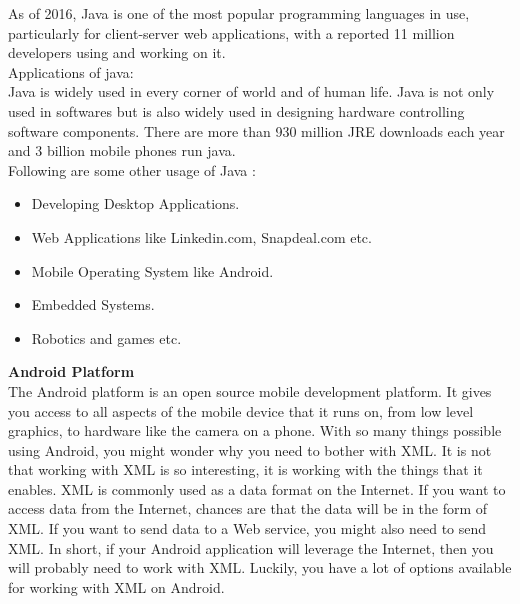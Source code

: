 As of 2016, Java is one of the most popular programming languages in use, particularly for client-server web applications, with a reported 11 million developers using and working on it.\\
Applications of java:\\
Java is widely used in every corner of world and of human life. Java is not only used in softwares but is also widely used in designing hardware controlling software components. There are more than 930 million JRE downloads each year and 3 billion mobile phones run java.\\
Following are some other usage of Java :
\begin{itemize}
	\item Developing Desktop Applications.
	\item Web Applications like Linkedin.com, Snapdeal.com etc.
	\item	Mobile Operating System like Android.
	\item	Embedded Systems.
	\item Robotics and games etc.
\end{itemize}
\textbf{Android Platform}\\
The Android platform is an open source mobile development platform. It gives you access to all aspects of the mobile device that it runs on, from low level graphics, to hardware like the camera on a phone. With so many things possible using Android, you might wonder why you need to bother with XML. It is not that working with XML is so interesting, it is working with the things that it enables. XML is commonly used as a data format on the Internet. If you want to access data from the Internet, chances are that the data will be in the form of XML. If you want to send data to a Web service, you might also need to send XML. In short, if your Android application will leverage the Internet, then you will probably need to work with XML. Luckily, you have a lot of options available for working with XML on Android.
